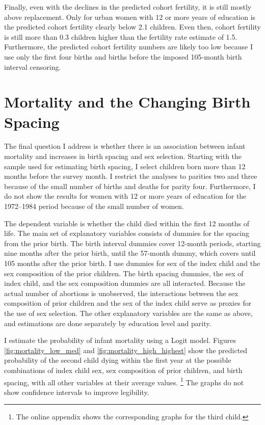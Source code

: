 \documentclass[12pt,letterpaper]{article}
\begin{document}
Finally, even with the declines in the predicted cohort fertility, it is still mostly 
above replacement.
Only for urban women with 12 or more years of education is the predicted cohort
fertility clearly below 2.1 children.
Even then, cohort fertility is still more than 0.3 children higher than 
the fertility rate estimate of 1.5.
Furthermore, the predicted cohort fertility numbers are likely too low because I use only 
the first four births and births before the imposed 105-month birth interval censoring.


\section{Mortality and the Changing Birth Spacing\label{sec:mortality}}

The final question I address is whether there is an association between infant mortality 
and increases in birth spacing and sex selection. 
Starting with the sample used for estimating birth spacing, I select children born more 
than 12 months before the survey month. 
I restrict the analyses to parities two and three because of the small number of births 
and deaths for parity four. 
Furthermore, I do not show the results for women with 12 or more years of education 
for the 1972--1984 period because of the small number of women.

The dependent variable is whether the child died within the first 12 months of life.
The main set of explanatory variables consists of dummies for the spacing from
the prior birth.
The birth interval dummies cover 12-month periods, starting nine months after the prior 
birth, until the 57-month dummy, which covers until 105 months after the prior birth.
I use dummies for sex of the index child and the sex composition 
of the prior children.
The birth spacing dummies, the sex of index child, and the sex composition dummies
are all interacted.
Because the actual number of abortions is unobserved, the interactions between
the sex composition of prior children and the sex of the index child serve
as proxies for the use of sex selection.
The other explanatory variables are the same as above, and estimations
are done separately by education level and parity.

I estimate the probability of infant mortality using a Logit model.
Figures \ref{fig:mortality_low_med} and \ref{fig:mortality_high_highest} show 
the predicted probability of the second child dying within the first year at the 
possible combinations of index child sex, sex composition of prior children, and 
birth spacing, with all other variables at their average values.%
\footnote{
The online appendix shows the corresponding graphs for the third child.
}
The graphs do not show confidence intervals to improve legibility.
\end{document}

